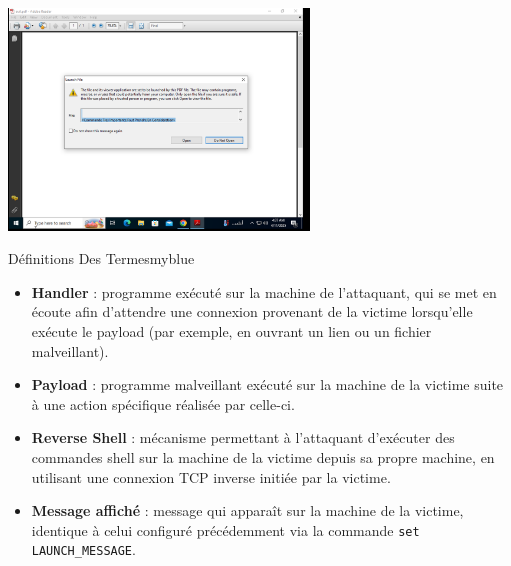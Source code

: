 \vspace{0.15cm}
\begin{center}
    \includegraphics[width=0.6\textwidth]{Question/SC/18.PNG}
\end{center}


\vspace{0.35cm}


\begin{prettyBox}{Définitions Des Termes}{myblue}
    \begin{itemize}
        \item \textbf{Handler} : programme exécuté sur la machine de l'attaquant, qui se met en écoute afin d'attendre une connexion provenant de la victime lorsqu'elle exécute le payload (par exemple, en ouvrant un lien ou un fichier malveillant).
        \item \textbf{Payload} : programme malveillant exécuté sur la machine de la victime suite à une action spécifique réalisée par celle-ci.
        \item \textbf{Reverse Shell} : mécanisme permettant à l'attaquant d'exécuter des commandes shell sur la machine de la victime depuis sa propre machine, en utilisant une connexion TCP inverse initiée par la victime.
        \item \textbf{Message affiché} : message qui apparaît sur la machine de la victime, identique à celui configuré précédemment via la commande \texttt{set LAUNCH\_MESSAGE}.
    \end{itemize}
\end{prettyBox}

